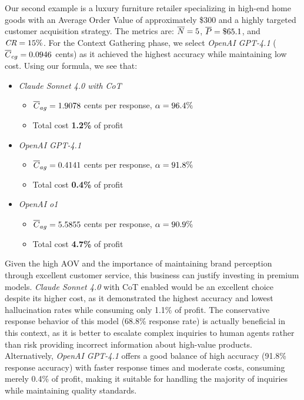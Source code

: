 Our second example is a luxury furniture retailer specializing in high-end home goods with an Average Order Value of approximately \$300 and a highly targeted customer acquisition strategy.
The metrics are: $\overline{N} = 5$, $\overline{P} = \$65.1$, and $\textit{CR} = 15\%$.
For the Context Gathering phase, we select \textit{OpenAI GPT-4.1} ($\overline{C}_{cg} = 0.0946$ cents) as it achieved the highest accuracy while maintaining low cost.
Using our formula, we see that:
\begin{itemize}
    \item \textit{Claude Sonnet 4.0 with CoT}
          \begin{itemize}
              \item $\overline{C}_{ag} = 1.9078$ cents per response, $\alpha = 96.4\%$
              \item Total cost \textbf{1.2\%} of profit
          \end{itemize}
    \item \textit{OpenAI GPT-4.1}
          \begin{itemize}
              \item $\overline{C}_{ag} = 0.4141$ cents per response, $\alpha = 91.8\%$
              \item Total cost \textbf{0.4\%} of profit
          \end{itemize}
    \item \textit{OpenAI o1}
          \begin{itemize}
              \item $\overline{C}_{ag} = 5.5855$ cents per response, $\alpha = 90.9\%$
              \item Total cost \textbf{4.7\%} of profit
          \end{itemize}
\end{itemize}
Given the high AOV and the importance of maintaining brand perception through excellent customer service, this business can justify investing in premium models.
\textit{Claude Sonnet 4.0} with CoT enabled would be an excellent choice despite its higher cost, as it demonstrated the highest accuracy and lowest hallucination rates while consuming only 1.1\% of profit.
The conservative response behavior of this model (68.8\% response rate) is actually beneficial in this context, as it is better to escalate complex inquiries to human agents rather than risk providing incorrect information about high-value products.
Alternatively, \textit{OpenAI GPT-4.1} offers a good balance of high accuracy (91.8\% response accuracy) with faster response times and moderate costs, consuming merely 0.4\% of profit, making it suitable for handling the majority of inquiries while maintaining quality standards.
